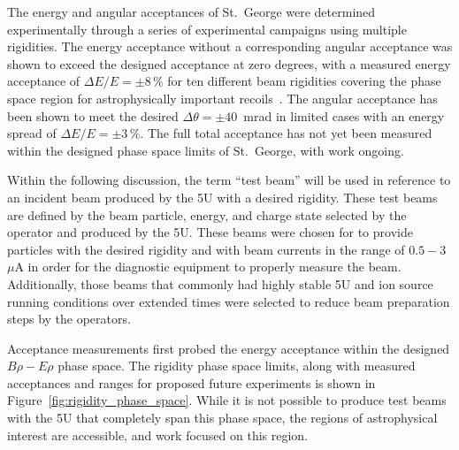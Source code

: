 The energy and angular acceptances of St.\ George were determined
experimentally through a series of experimental campaigns using multiple
rigidities. The energy acceptance without a corresponding angular acceptance
was shown to exceed the designed acceptance at zero degrees, with a measured
energy acceptance of $\Delta E/E = \pm 8$\,\% for ten different beam
rigidities covering the phase space region for astrophysically important
recoils~\cite{Meisel2017}. The angular acceptance has been shown to meet the
desired $\Delta\theta = \pm 40$~mrad in limited cases with an energy spread of
$\Delta E/E = \pm 3$\,\%. The full total acceptance has not yet been measured
within the designed phase space limits of St.\ George, with work ongoing.

Within the following discussion, the term ``test beam'' will be used in
reference to an incident beam produced by the 5U with a desired rigidity. These
test beams are defined by the beam particle, energy, and charge state selected
by the operator and produced by the 5U. These beams were chosen for to
provide particles with the desired rigidity and with beam currents in the range
of $0.5 - 3$~$\mu$A in order for the diagnostic equipment to properly measure
the beam. Additionally, those beams that commonly had highly stable 5U and ion
source running conditions over extended times were selected to reduce beam
preparation steps by the operators.

Acceptance measurements first probed the energy acceptance within the designed
$B\rho-E\rho$ phase space. The rigidity phase space
limits, along with measured acceptances and ranges for proposed future
experiments is shown in Figure~\ref{fig:rigidity_phase_space}. While it is not
possible to produce test beams with the 5U that completely span this phase
space, the regions of astrophysical interest are accessible, and work focused
on this region.

